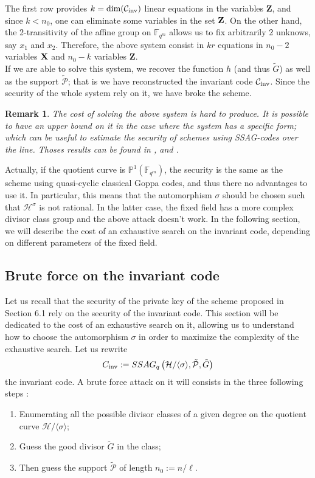 \documentclass[10pt]{article}
\newtheorem{rq1}[thm]{Remark}
\newcommand{\s}{\vspace{0.3cm}}
\newcommand{\PP}{\mathbb{P}}
\newcommand{\fqm}{\mathbb{F}_{q^m}}
\newcommand{\PR}{\mathcal{P}}
\begin{document}
The first row provides $k=\rm dim(\mathcal{C}_{\rm{inv}})$ linear equations in the variables $\textbf{Z}$, and since $k < n_0$, one can eliminate some variables in the set $\bf{Z}$. On the other hand, the 2-transitivity of the affine group on $\fqm$ allows us to fix arbitrarily 2 unknows, say $x_1$ and $x_2$. Therefore, the above system consist in $kr$ equations in $n_0-2$ variables $\bf{X}$ and $n_0-k$ variables $\textbf{Z}$. \\
If we are able to solve this system, we recover the function $h$ (and thus $\tilde{G}$) as well as the support $\tilde{\PR}$; that is we have reconstructed the invariant code $\mathcal{C}_{\rm inv}$. Since the security of the whole system rely on it, we have broke the scheme.  

\s

\begin{rq1} \rm
The cost of solving the above system is hard to produce. It is possible to have an upper bound on it in the case where the system has a specific form; which can be useful to estimate the security of schemes using SSAG-codes over the line. Thoses results can be found in \cite{FOP}, \cite{FOP1} and \cite{FOP2}. 
\end{rq1}

Actually, if the quotient curve is $\PP^1(\fqm)$, the security is the same as the scheme using quasi-cyclic classical Goppa codes, and thus there no advantages to use it. In particular, this means that the automorphism $\sigma$ should be chosen such that $\mathcal{H}^{\sigma}$ is not rational. In the latter case, the fixed field has a more complex divisor class group and the above attack doesn't work. In the following section, we will describe the cost of an exhaustive search on the invariant code, depending on different parameters of the fixed field.

\s

\subsection{Brute force on the invariant code}

\s

Let us recall that the security of the private key of the scheme proposed in Section 6.1 rely on the security of the invariant code. This section will be dedicated to the cost of an exhaustive search on it, allowing us to understand how to choose the automorphism $\sigma$ in order to maximize the complexity of the exhaustive search. Let us rewrite 
\[C_{\rm inv} := SSAG_q\left(\mathcal{H}/\langle \sigma \rangle,\tilde{\PR},\tilde{G}\right)\]
the invariant code. A brute force attack on it will consists in the three following steps :
\begin{enumerate}
\item Enumerating all the possible divisor classes of a given degree on the quotient curve $\mathcal{H}/\langle \sigma \rangle$;
\item Guess the good divisor $\tilde{G}$ in the class;
\item Then guess the support $\tilde{\PR}$ of length $n_0:=n/\ell$.
\end{enumerate}
\end{document}
